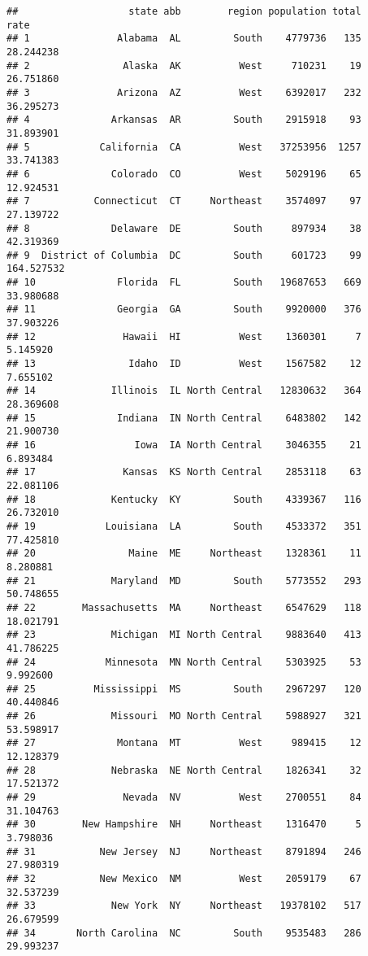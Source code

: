 \documentclass[
]{article}
\begin{document}
\begin{verbatim}
##                   state abb        region population total       rate
## 1               Alabama  AL         South    4779736   135  28.244238
## 2                Alaska  AK          West     710231    19  26.751860
## 3               Arizona  AZ          West    6392017   232  36.295273
## 4              Arkansas  AR         South    2915918    93  31.893901
## 5            California  CA          West   37253956  1257  33.741383
## 6              Colorado  CO          West    5029196    65  12.924531
## 7           Connecticut  CT     Northeast    3574097    97  27.139722
## 8              Delaware  DE         South     897934    38  42.319369
## 9  District of Columbia  DC         South     601723    99 164.527532
## 10              Florida  FL         South   19687653   669  33.980688
## 11              Georgia  GA         South    9920000   376  37.903226
## 12               Hawaii  HI          West    1360301     7   5.145920
## 13                Idaho  ID          West    1567582    12   7.655102
## 14             Illinois  IL North Central   12830632   364  28.369608
## 15              Indiana  IN North Central    6483802   142  21.900730
## 16                 Iowa  IA North Central    3046355    21   6.893484
## 17               Kansas  KS North Central    2853118    63  22.081106
## 18             Kentucky  KY         South    4339367   116  26.732010
## 19            Louisiana  LA         South    4533372   351  77.425810
## 20                Maine  ME     Northeast    1328361    11   8.280881
## 21             Maryland  MD         South    5773552   293  50.748655
## 22        Massachusetts  MA     Northeast    6547629   118  18.021791
## 23             Michigan  MI North Central    9883640   413  41.786225
## 24            Minnesota  MN North Central    5303925    53   9.992600
## 25          Mississippi  MS         South    2967297   120  40.440846
## 26             Missouri  MO North Central    5988927   321  53.598917
## 27              Montana  MT          West     989415    12  12.128379
## 28             Nebraska  NE North Central    1826341    32  17.521372
## 29               Nevada  NV          West    2700551    84  31.104763
## 30        New Hampshire  NH     Northeast    1316470     5   3.798036
## 31           New Jersey  NJ     Northeast    8791894   246  27.980319
## 32           New Mexico  NM          West    2059179    67  32.537239
## 33             New York  NY     Northeast   19378102   517  26.679599
## 34       North Carolina  NC         South    9535483   286  29.993237

\end{verbatim}
\end{document}
